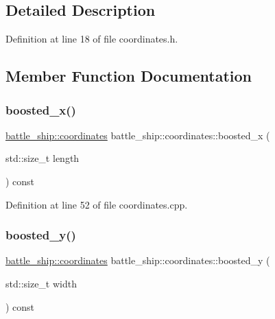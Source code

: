 \subsection{Detailed Description}


Definition at line 18 of file coordinates.\+h.



\subsection{Member Function Documentation}
\mbox{\label{structbattle__ship_1_1coordinates_a2ab2b70ad53571e339c4c509547419c7}} 
\subsubsection{\texorpdfstring{boosted\+\_\+x()}{boosted\_x()}}
{\footnotesize\ttfamily \hyperlink{structbattle__ship_1_1coordinates}{battle\+\_\+ship\+::coordinates} battle\+\_\+ship\+::coordinates\+::boosted\+\_\+x (\begin{DoxyParamCaption}\item[{std\+::size\+\_\+t}]{length }\end{DoxyParamCaption}) const}



Definition at line 52 of file coordinates.\+cpp.

\mbox{\label{structbattle__ship_1_1coordinates_af45f6a271dd7c5c97556d2593d455313}} 
\subsubsection{\texorpdfstring{boosted\+\_\+y()}{boosted\_y()}}
{\footnotesize\ttfamily \hyperlink{structbattle__ship_1_1coordinates}{battle\+\_\+ship\+::coordinates} battle\+\_\+ship\+::coordinates\+::boosted\+\_\+y (\begin{DoxyParamCaption}\item[{std\+::size\+\_\+t}]{width }\end{DoxyParamCaption}) const}



